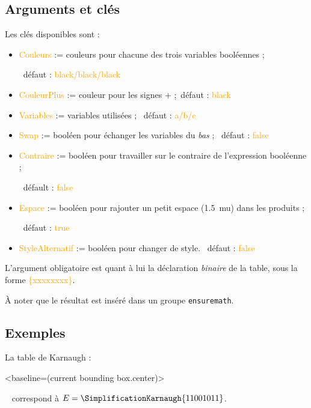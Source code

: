 \documentclass[french,a4paper,11pt]{article}
\newcommand\Cle[1]{{\small\sffamily\textlangle \textcolor{orange}{#1}\textrangle}}
\begin{document}
{{\pagebreak

\subsection{Arguments et clés }

\begin{DemoCode}
\end{DemoCode}

\begin{tipblock}
Les clés disponibles sont :

\begin{itemize}
	\item \Cle{Couleurs} := couleurs pour chacune des trois variables booléennes ;

	\hfill~défaut : \Cle{black/black/black}
	\item \Cle{CouleurPlus} := couleur pour les signes + ;\hfill~défaut : \Cle{black}
	\item \Cle{Variables} := variables utilisées ; \hfill~défaut : \Cle{a/b/c}
	\item \Cle{Swap} := booléen pour échanger les variables du \textit{bas} ; \hfill~défaut : \Cle{false}
	\item \Cle{Contraire} := booléen pour travailler sur le contraire de l'expression booléenne ;

	\hfill~défault : \Cle{false}
	\item \Cle{Espace} := booléen pour rajouter un petit espace (1.5~mu) dans les produits ;

	\hfill~défaut : \Cle{true}
	\item \Cle{StyleAlternatif} := booléen pour changer de style. \hfill~défaut : \Cle{false}
\end{itemize}

L'argument obligatoire est quant à lui la déclaration \textit{binaire} de la table, sous la forme \Cle{\{xxxxxxxx\}}.

\smallskip

À noter que le résultat est inséré dans un groupe \texttt{ensuremath}.
\end{tipblock}

\subsection{Exemples}

\begin{DemoCode}
La table de Karnaugh :
\begin{TableKarnaugh}<baseline=(current bounding box.center)>
\end{TableKarnaugh}~
correspond à $E=\SimplificationKarnaugh{11001011}$.
\end{DemoCode}

}}
\end{document}
